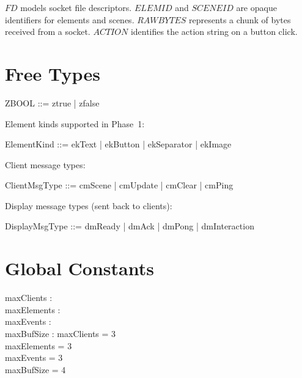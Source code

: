 \documentclass[a4paper,10pt,fleqn]{article}
\begin{document}
$FD$ models socket file descriptors.  $ELEMID$ and $SCENEID$ are
opaque identifiers for elements and scenes.  $RAWBYTES$ represents
a chunk of bytes received from a socket.  $ACTION$ identifies
the action string on a button click.

\section{Free Types}

\begin{zed}
  ZBOOL ::= ztrue | zfalse
\end{zed}

Element kinds supported in Phase~1:
\begin{zed}
  ElementKind ::= ekText | ekButton | ekSeparator | ekImage
\end{zed}

Client message types:
\begin{zed}
  ClientMsgType ::= cmScene | cmUpdate | cmClear | cmPing
\end{zed}

Display message types (sent back to clients):
\begin{zed}
  DisplayMsgType ::= dmReady | dmAck | dmPong | dmInteraction
\end{zed}

\section{Global Constants}

\begin{axdef}
  maxClients : \nat \\
  maxElements : \nat \\
  maxEvents : \nat \\
  maxBufSize : \nat
  \where
  maxClients = 3 \\
  maxElements = 3 \\
  maxEvents = 3 \\
  maxBufSize = 4
\end{axdef}
\end{document}
